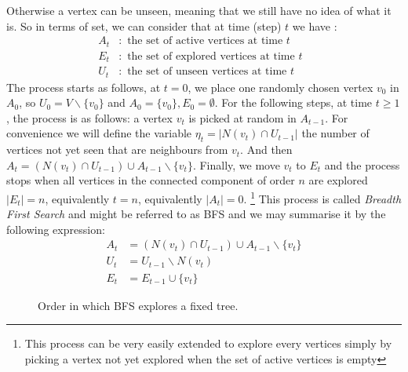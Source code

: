 Otherwise a vertex can be unseen, meaning that we still have no idea of what it is.
So in terms of set, we can consider that at time (step) $t$ we have :
\begin{align}
	A_t&: \text{ the set of active vertices at time $t$ } \\
	E_t&: \text{ the set of explored vertices at time $t$ } \\
	U_t&: \text{ the set of unseen vertices at time $t$ } 
\end{align}
The process starts as follows, at $t = 0$, we place one randomly chosen vertex $v_0$ in $A_0$, so $U_0 = V\backslash \{v_0\}$ and $A_0 = \{v_0\}, E_0=\emptyset $.
\newline
For the following steps, at time $t \geq 1$, the process is as follows: a vertex $v_t$ is picked at random in $A_{t-1}$. 
For convenience we will define the variable $\eta_t = |N(v_t) \cap U_{t-1}|$ the number of vertices not yet seen that are neighbours from $v_t$.
And then $A_t = (N(v_t)\cap U_{t-1} ) \cup A_{t-1} \backslash \{v_t\}$.
Finally, we move $v_t$ to $E_t$ and the process stops when all vertices in the connected component of order $n$ are explored $|E_t| = n$, equivalently $t=n$, equivalently $|A_t| = 0$.
\footnote{This process can be very easily extended to explore every vertices simply by picking a vertex not yet explored when the set of active vertices is empty}
\newline
This process is called \emph{Breadth First Search} and might be referred to as BFS and we may summarise it by the following expression:
\begin{align}
    A_t &= (N(v_t) \cap U_{t-1})\cup A_{t-1} \backslash \{v_t\} \\
    U_t &= U_{t-1}\backslash N(v_t)  \\
    E_t &= E_{t-1}\cup \{v_t\}
\end{align}
\begin{figure}[h]
	\centering
	\caption{Order in which BFS explores a fixed tree.}
	\label{fig:BFS}
\end{figure}	
